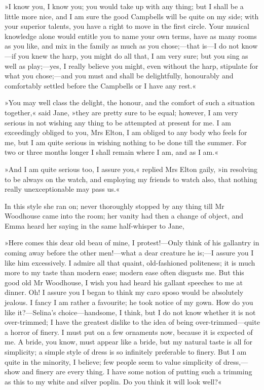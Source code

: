 »I know you, I know you; you would take up with any thing; but I shall be a little more nice, and I am sure the good Campbells will be quite on my side; with your superior talents, you have a right to move in the first circle. Your musical knowledge alone would entitle you to name your own terms, have as many rooms as you like, and mix in the family as much as you chose;—that is—I do not know—if you knew the harp, you might do all that, I am very sure; but you sing as well as play;—yes, I really believe you might, even without the harp, stipulate for what you chose;—and you must and shall be delightfully, honourably and comfortably settled before the Campbells or I have any rest.«

»You may well class the delight, the honour, and the comfort of such a situation together,« said Jane, »they are pretty sure to be equal; however, I am very serious in not wishing any thing to be attempted at present for me. I am exceedingly obliged to you, Mrs Elton, I am obliged to any body who feels for me, but I am quite serious in wishing nothing to be done till the summer. For two or three months longer I shall remain where I am, and as I am.«

»And I am quite serious too, I assure you,« replied Mrs Elton gaily, »in resolving to be always on the watch, and employing my friends to watch also, that nothing really unexceptionable may pass us.«

In this style she ran on; never thoroughly stopped by any thing till Mr Woodhouse came into the room; her vanity had then a change of object, and Emma heard her saying in the same half-whisper to Jane,

»Here comes this dear old beau of mine, I protest!—Only think of his gallantry in coming away before the other men!—what a dear creature he is;—I assure you I like him excessively. I admire all that quaint, old-fashioned politeness; it is much more to my taste than modern ease; modern ease often disgusts me. But this good old Mr Woodhouse, I wish you had heard his gallant speeches to me at dinner. Oh! I assure you I began to think my caro sposo would be absolutely jealous. I fancy I am rather a favourite; he took notice of my gown. How do you like it?—Selina's choice—handsome, I think, but I do not know whether it is not over-trimmed; I have the greatest dislike to the idea of being over-trimmed—quite a horror of finery. I must put on a few ornaments now, because it is expected of me. A bride, you know, must appear like a bride, but my natural taste is all for simplicity; a simple style of dress is so infinitely preferable to finery. But I am quite in the minority, I believe; few people seem to value simplicity of dress,—show and finery are every thing. I have some notion of putting such a trimming as this to my white and silver poplin. Do you think it will look well?«

